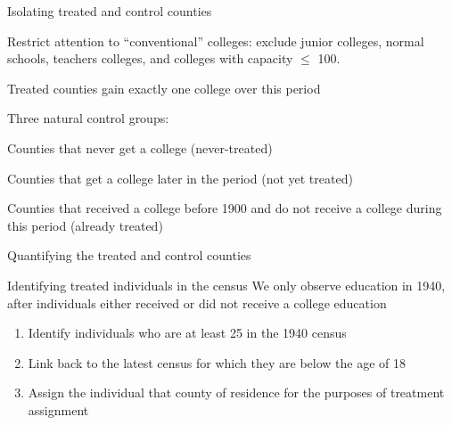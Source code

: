 \documentclass[notes,11pt, aspectratio=169]{beamer}
\newenvironment{wideitemize}{\itemize\addtolength{\itemsep}{10pt}}{\enditemize}
\begin{document}
\begin{frame}[label=isolating]{Isolating treated and control counties}
  \begin{wideitemize}
    \item Restrict attention to ``conventional'' colleges: exclude junior colleges, normal schools, teachers colleges, and colleges with capacity $\leq$ 100.
    \item Treated counties gain exactly one college over this period
    \item Three natural control groups:
    \begin{wideitemize}
      \item Counties that never get a college (never-treated)
      \item Counties that get a college later in the period (not yet treated)
      \item Counties that received a college before 1900 and do not receive a college during this period (already treated)
    \end{wideitemize}
  \end{wideitemize}

  \vspace{1em}
  \centering
  \hyperlink{spatialstability}{}
  \raggedright
  \hyperlink{countycrosswalk}{}
\end{frame}

\begin{frame}{Quantifying the treated and control counties}
  
\end{frame}

\begin{frame}{Identifying treated individuals in the census}
  We only observe education in 1940, after individuals either received or did not receive a college education \vspace{.4cm}
  \begin{enumerate}
    \item Identify individuals who are at least 25 in the 1940 census
    \item Link back to the latest census for which they are below the age of 18
    \item Assign the individual that county of residence for the purposes of treatment assignment
  \end{enumerate}
\end{frame}
\end{document}

